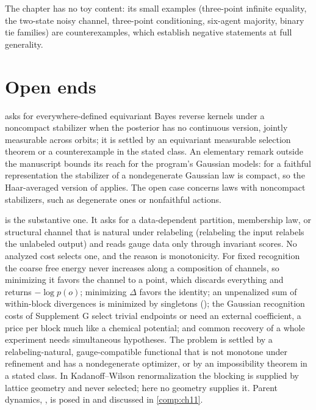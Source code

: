The chapter has no toy content: its small examples (three-point infinite equality, the two-state noisy
channel, three-point conditioning, six-agent majority, binary tie families) are counterexamples, which
establish negative statements at full generality.

\section{Open ends}
\label{comp:ch09-open}

 asks for everywhere-defined equivariant Bayes reverse kernels under a
noncompact stabilizer when the posterior has no continuous version, jointly measurable across orbits;
it is settled by an equivariant measurable selection theorem or a counterexample in the stated class.
An elementary remark outside the manuscript bounds its reach for the program's Gaussian models: for a
faithful representation the stabilizer of a nondegenerate Gaussian law is compact, so the Haar-averaged
version of  applies. The open case concerns laws with noncompact
stabilizers, such as degenerate ones or nonfaithful actions.

 is the substantive one. It asks for a data-dependent partition, membership
law, or structural channel that is natural under relabeling (relabeling the input relabels the unlabeled
output) and reads gauge data only through invariant scores. No analyzed cost selects one, and the reason
is monotonicity. For fixed recognition the coarse free energy never increases along a composition of
channels, so minimizing it favors the channel to a point, which discards everything and returns
$-\log p(o)$; minimizing $\Delta$ favors the identity; an unpenalized sum of within-block divergences is
minimized by singletons (); the Gaussian recognition costs of
Supplement G select trivial endpoints or need an external coefficient, a price per block much like a
chemical potential; and common recovery of a whole experiment needs simultaneous hypotheses. The problem
is settled by a relabeling-natural, gauge-compatible functional that is not monotone under refinement and
has a nondegenerate optimizer, or by an impossibility theorem in a stated class. In Kadanoff--Wilson
renormalization the blocking is supplied by lattice geometry and never selected; here no geometry
supplies it. Parent dynamics, , is posed in
 and discussed in \cref{comp:ch11}.

